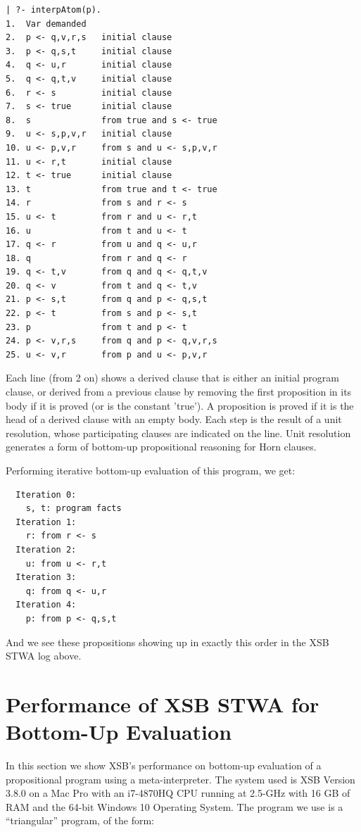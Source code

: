 \footnotesize
\begin{verbatim}
| ?- interpAtom(p).
1.  Var demanded
2.  p <- q,v,r,s   initial clause
3.  p <- q,s,t     initial clause
4.  q <- u,r       initial clause
5.  q <- q,t,v     initial clause
6.  r <- s         initial clause
7.  s <- true      initial clause
8.  s              from true and s <- true
9.  u <- s,p,v,r   initial clause
10. u <- p,v,r     from s and u <- s,p,v,r
11. u <- r,t       initial clause
12. t <- true      initial clause
13. t              from true and t <- true
14. r              from s and r <- s
15. u <- t         from r and u <- r,t
16. u              from t and u <- t
17. q <- r         from u and q <- u,r
18. q              from r and q <- r
19. q <- t,v       from q and q <- q,t,v
20. q <- v         from t and q <- t,v
21. p <- s,t       from q and p <- q,s,t
22. p <- t         from s and p <- s,t
23. p              from t and p <- t
24. p <- v,r,s     from q and p <- q,v,r,s
25. u <- v,r       from p and u <- p,v,r
\end{verbatim}
\normalsize

Each line (from 2 on) shows a derived clause that is either an initial
program clause, or derived from a previous clause by removing the
first proposition in its body if it is proved (or is the constant
'true').  A proposition is proved if it is the head of a derived
clause with an empty body.  Each step is the result of a unit
resolution, whose participating clauses are indicated on the line.
Unit resolution generates a form of bottom-up propositional reasoning
for Horn clauses.

\vspace{0.15cm}
Performing iterative bottom-up evaluation of this program, we get:
\footnotesize
\begin{verbatim}
  Iteration 0:
    s, t: program facts
  Iteration 1: 
    r: from r <- s
  Iteration 2:
    u: from u <- r,t
  Iteration 3:
    q: from q <- u,r
  Iteration 4:
    p: from p <- q,s,t
\end{verbatim}
\normalsize
\noindent And we see these propositions showing up in exactly this
order in the XSB STWA log above.


\section{Performance of XSB STWA for Bottom-Up Evaluation}

In this section we show XSB's performance on bottom-up evaluation of a
propositional program using a meta-interpreter.  The system used is
XSB Version 3.8.0 on a Mac Pro with an i7-4870HQ CPU running at
2.5-GHz with 16 GB of RAM and the 64-bit Windows 10 Operating System.
The program we use is a ``triangular'' program, of the form:

